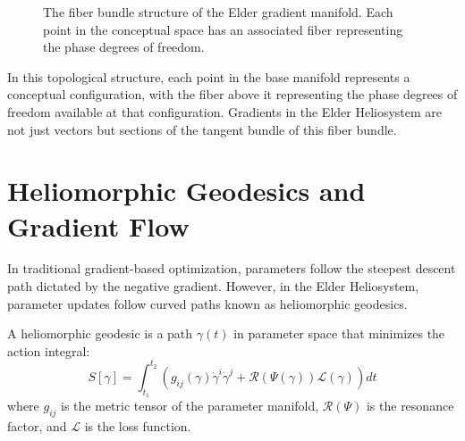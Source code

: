 \begin{figure}[ht]
\centering
{}
\caption{The fiber bundle structure of the Elder gradient manifold. Each point in the conceptual space has an associated fiber representing the phase degrees of freedom.}
\label{fig:fiber_bundle}
\end{figure}

In this topological structure, each point in the base manifold represents a conceptual configuration, with the fiber above it representing the phase degrees of freedom available at that configuration. Gradients in the Elder Heliosystem are not just vectors but sections of the tangent bundle of this fiber bundle.

\section{Heliomorphic Geodesics and Gradient Flow}

In traditional gradient-based optimization, parameters follow the steepest descent path dictated by the negative gradient. However, in the Elder Heliosystem, parameter updates follow curved paths known as heliomorphic geodesics.

\begin{definition}
A heliomorphic geodesic is a path $\gamma(t)$ in parameter space that minimizes the action integral:
\begin{equation}
S[\gamma] = \int_{t_1}^{t_2} \left( g_{ij}(\gamma) \dot{\gamma}^i \dot{\gamma}^j + \mathcal{R}(\Psi(\gamma)) \mathcal{L}(\gamma) \right) dt
\end{equation}
where $g_{ij}$ is the metric tensor of the parameter manifold, $\mathcal{R}(\Psi)$ is the resonance factor, and $\mathcal{L}$ is the loss function.
\end{definition}

